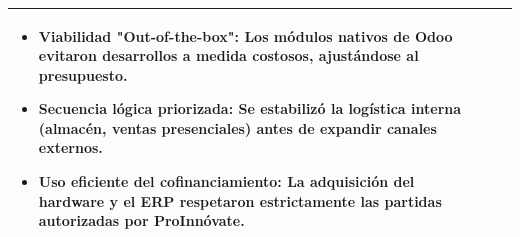 \documentclass[11pt]{article}
\begin{document}
\begin{longtable}{|p{3.8cm}|p{3.8cm}|p{3.8cm}|p{3.8cm}|}
\begin{itemize}[leftmargin=*,nosep]
    \item \textbf{Viabilidad "Out-of-the-box":} Los módulos nativos de Odoo evitaron desarrollos a medida costosos, ajustándose al presupuesto.
    \item \textbf{Secuencia lógica priorizada:} Se estabilizó la logística interna (almacén, ventas presenciales) antes de expandir canales externos.
    \item \textbf{Uso eficiente del cofinanciamiento:} La adquisición del hardware y el ERP respetaron estrictamente las partidas autorizadas por ProInnóvate.
\end{itemize} \\ \hline
\end{longtable}
\end{document}
